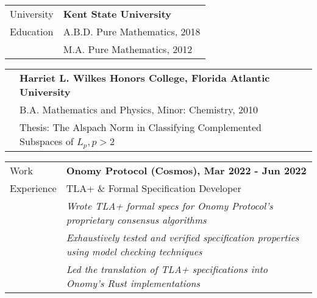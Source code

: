 \documentclass[letterpaper,10pt,oneside]{article}
\begin{document}
\vspace{0.1in}



\noindent \begin{tabular}{@{} l l}
 \Large{University} & \textbf{Kent State University} \\
 \Large{Education} & A.B.D. Pure Mathematics, 2018 \\
 \hspace{1.1in} & M.A. Pure Mathematics, 2012 \\
\end{tabular}

\vfill


\noindent \begin{tabular}{@{} l l}
 \hspace{1.1in} & \textbf{Harriet L. Wilkes Honors College, Florida Atlantic University} \\
 & B.A. Mathematics and Physics, Minor: Chemistry, 2010 \\
 & Thesis: The Alspach Norm in Classifying Complemented Subspaces of $L_p, p>2$ \\
\end{tabular}

\vfill



\noindent \begin{tabular}{@{} l l}
 \Large{Work} & \textbf{Onomy Protocol (Cosmos), Mar 2022 - Jun 2022} \\
 \Large{Experience} & TLA+ \& Formal Specification Developer \\
 \hspace{1.1in} & \emph{Wrote TLA+ formal specs for Onomy Protocol's proprietary consensus algorithms} \\
 & \emph{Exhaustively tested and verified specification properties using model checking techniques} \\
 & \emph{Led the translation of TLA+ specifications into Onomy's Rust implementations} \\
\end{tabular}

\vfill

\end{document}
